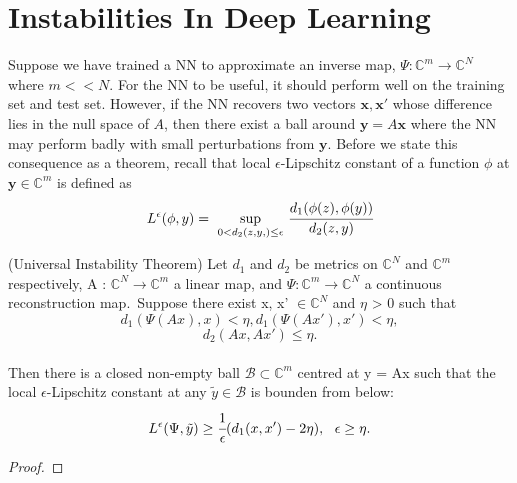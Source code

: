 \chapter{Instabilities In Deep Learning}

Suppose we have trained a NN to approximate an inverse map, $\Psi: \mathbb{C}^{m}\rightarrow  \mathbb{C}^{N}$ where $m << N$. For the NN to be useful, it should perform well on the training set and test set. However, if the NN recovers two vectors $\mathbf{x, x'}$  whose difference lies in the null space of $A$, then there exist a ball around $\mathbf{y}=A\mathbf{x}$ where the NN may perform badly with small perturbations from $\mathbf{y}$. Before we state this consequence as a theorem, recall that local $\epsilon$-Lipschitz constant of a function $\phi$ at $\mathbf{y} \in \mathbb{C}^{m}$ is defined as
\begin{equation*}
L^{\epsilon}(\phi,y) = \ \underset{0<d_{2}(z,y,)\leq \epsilon}{\text{sup}} \ \cfrac{d_1(\phi(z),\phi(y))}{d_2(z,y)}
\end{equation*}


\begin{theorem} (Universal Instability Theorem)
Let $d_1$ and $d_2$ be metrics on $\mathbb{C}^N$ and $\mathbb{C}^m$ respectively, A : $\mathbb{C}^{N}\rightarrow  \mathbb{C}^{m}$ a linear map, and $\Psi : \mathbb{C}^{m}\rightarrow  \mathbb{C}^{N}$ a continuous reconstruction map. Suppose there exist x, x' $\in \mathbb{C}^{N}$ and $\eta$ > 0 such that 
\begin{equation}
d_1(\Psi(Ax),x) < \eta , d_1(\Psi(Ax'),x') < \eta, 
\end{equation}
\begin{equation}
d_2(Ax,Ax') \leq \eta. 
\end{equation}
\\
Then there is a closed non-empty ball $\mathcal{B} \subset \mathbb{C}^m$ centred at y = Ax such that the local $\epsilon$-Lipschitz constant at any $\tilde{y} \in \mathcal{B}$ is bounden from below: 
\begin{equation}
L^{\epsilon}(\Psi,\tilde{y}) \geq \cfrac{1}{\epsilon}  (d_1(x,x') - 2\eta) , \ \ \epsilon \geq \eta. 
\end{equation}
\end{theorem}



\begin{proof}
\end{proof}